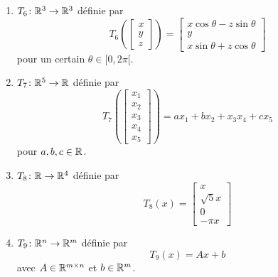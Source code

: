 \begin{exercice}
\begin{enumerate}
    \item $T_6 \colon \mathbb{R}^3 \to \mathbb{R}^3$ définie par
    \[
        T_6 \left(\begin{bmatrix}x\\y\\z\end{bmatrix} \right) = \begin{bmatrix}x\cos\theta-z\sin\theta\\y\\x\sin\theta+z\cos\theta\end{bmatrix}
    \]
    pour un certain $\theta \in [0, 2\pi [$.
    
    \item $T_7 \colon \mathbb{R}^5 \to \mathbb{R}$ définie par
    \[
        T_7 \left(\begin{bmatrix}x_1\\x_2\\x_3\\x_4\\x_5\end{bmatrix} \right) = ax_1 + bx_2 + x_3 x_4 + cx_5
    \]
    pour $a,b,c \in \mathbb{R}$.
    
    \item $T_8 \colon \mathbb{R} \to \mathbb{R}^4$ définie par
    \[
        T_8(x) = \begin{bmatrix}x\\\sqrt{5}x\\0\\-\pi x\end{bmatrix}
    \]
    
    \item $T_9 \colon \mathbb{R}^n \to \mathbb{R}^m$ définie par
    \[
        T_9 (x) = Ax + b
    \]
    avec $A \in \mathbb{R}^{m \times n}$ et $b \in \mathbb{R}^m$. \\
\end{enumerate}
\end{exercice}

